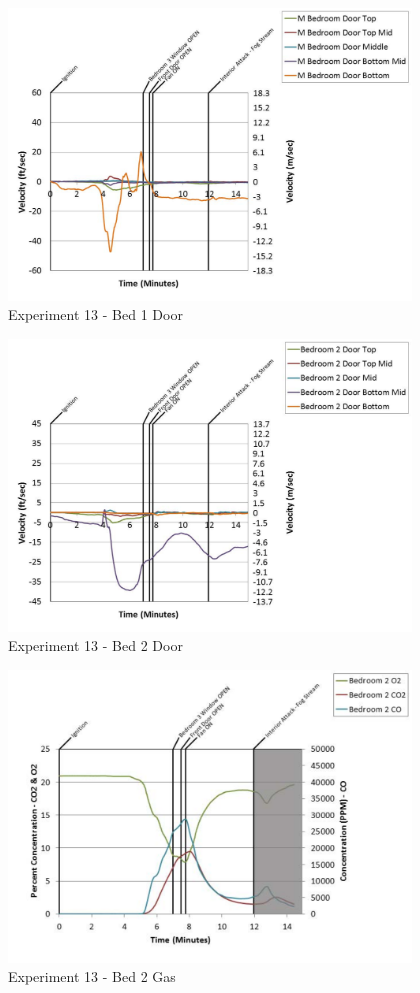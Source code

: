 \documentclass{article}
\begin{document}
\begin{appendices}
	\clearpage

	\begin{figure}[h!]
		\centering
		\includegraphics[height=3.05in]{0_Images/Results_Charts/Exp_13_Charts/Bed1Door.pdf}
		\caption{Experiment 13 - Bed 1 Door}
	\end{figure}
 

	\begin{figure}[h!]
		\centering
		\includegraphics[height=3.05in]{0_Images/Results_Charts/Exp_13_Charts/Bed2Door.pdf}
		\caption{Experiment 13 - Bed 2 Door}
	\end{figure}
 
	\clearpage

	\begin{figure}[h!]
		\centering
		\includegraphics[height=3.05in]{0_Images/Results_Charts/Exp_13_Charts/Bed2Gas.pdf}
		\caption{Experiment 13 - Bed 2 Gas}
	\end{figure}
 


\end{appendices}
\end{document}
